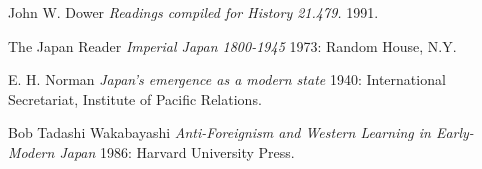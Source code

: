 \begin{thebibliography}{1}

 John W. Dower {\em Readings compiled for History
21.479.}  1991.

  The Japan Reader {\em Imperial Japan 1800-1945} 1973:
Random House, N.Y.

 E. H. Norman {\em Japan's emergence as a modern
state} 1940: International Secretariat, Institute of Pacific
Relations.

 Bob Tadashi Wakabayashi {\em Anti-Foreignism and Western
Learning in Early-Modern Japan} 1986: Harvard University Press.

\end{thebibliography}